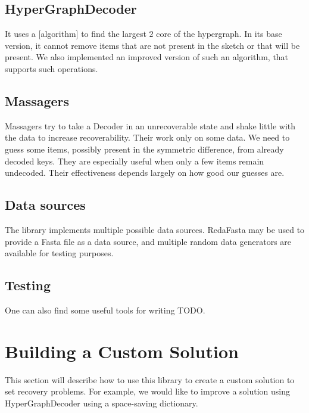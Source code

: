 \subsection{HyperGraphDecoder}
It uses a [algorithm] to find the largest $2$ core of the hypergraph. In its base version, it cannot remove items that are not present in the sketch or that will be present. We also implemented an improved version of such an algorithm, that supports such operations. 

\subsection{Massagers}
Massagers try to take a Decoder in an unrecoverable state and shake little with the data to increase recoverability. Their work only on some data. We need to guess some items, possibly present in the symmetric difference, from already decoded keys. They are especially useful when only a few items remain undecoded. Their effectiveness depends largely on how good our guesses are.

\subsection{Data sources}
The library implements multiple possible data sources. RedaFasta may be used to provide a Fasta file as a data source, and multiple random data generators are available for testing purposes.

\subsection{Testing}
One can also find some useful tools for writing TODO.


\section{Building a Custom Solution}
This section will describe how to use this library to create a custom solution to set recovery problems. For example, we would like to improve a solution using HyperGraphDecoder using a space-saving dictionary.

